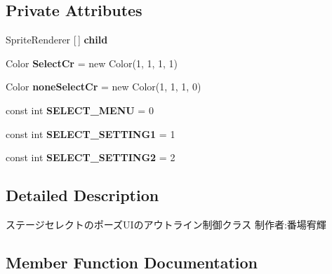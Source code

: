 \subsection*{Private Attributes}
\begin{DoxyCompactItemize}
\item 
\mbox{\label{class_stage_select_pause_u_i_outline_aa9e653c662ad0dcba95d9bcd8d431f9d}} 
Sprite\+Renderer \mbox{[}$\,$\mbox{]} {\bfseries child}
\item 
\mbox{\label{class_stage_select_pause_u_i_outline_adb581f36ec65d1c083cb56d7cfe4026b}} 
Color {\bfseries Select\+Cr} = new Color(1, 1, 1, 1)
\item 
\mbox{\label{class_stage_select_pause_u_i_outline_a1b70c5bf3c6a1b563301cf9bdea0b0f6}} 
Color {\bfseries none\+Select\+Cr} = new Color(1, 1, 1, 0)
\item 
\mbox{\label{class_stage_select_pause_u_i_outline_a97afb139083d5fd52261c09928eda7e2}} 
const int {\bfseries S\+E\+L\+E\+C\+T\+\_\+\+M\+E\+NU} = 0
\item 
\mbox{\label{class_stage_select_pause_u_i_outline_a73241e97dde5539b652c4d5e3eb4c48e}} 
const int {\bfseries S\+E\+L\+E\+C\+T\+\_\+\+S\+E\+T\+T\+I\+N\+G1} = 1
\item 
\mbox{\label{class_stage_select_pause_u_i_outline_a0c3032e19e817320e79399077cbe74c3}} 
const int {\bfseries S\+E\+L\+E\+C\+T\+\_\+\+S\+E\+T\+T\+I\+N\+G2} = 2
\end{DoxyCompactItemize}


\subsection{Detailed Description}
ステージセレクトのポーズ\+U\+Iのアウトライン制御クラス 制作者\+:番場宥輝 



\subsection{Member Function Documentation}
\mbox{\label{class_stage_select_pause_u_i_outline_a7a067fec10f43b15167a325f142cdb45}} 
